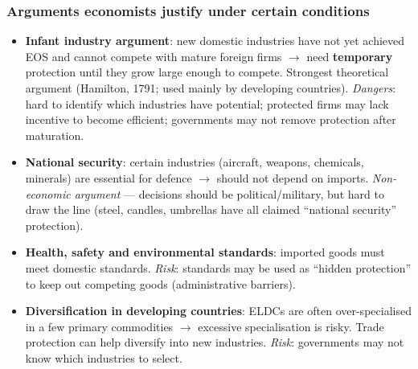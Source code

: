 \documentclass[a4paper,12pt]{article}
\begin{document}
\subsubsection*{Arguments economists justify under certain conditions}
\begin{itemize}
  \item \textbf{Infant industry argument}: new domestic industries have not yet achieved EOS and cannot compete with mature foreign firms $\to$ need \textbf{temporary} protection until they grow large enough to compete. Strongest theoretical argument (Hamilton, 1791; used mainly by developing countries). \textit{Dangers}: hard to identify which industries have potential; protected firms may lack incentive to become efficient; governments may not remove protection after maturation.
  \item \textbf{National security}: certain industries (aircraft, weapons, chemicals, minerals) are essential for defence $\to$ should not depend on imports. \textit{Non-economic argument} --- decisions should be political/military, but hard to draw the line (steel, candles, umbrellas have all claimed ``national security'' protection).
  \item \textbf{Health, safety and environmental standards}: imported goods must meet domestic standards. \textit{Risk}: standards may be used as ``hidden protection'' to keep out competing goods (administrative barriers).
  \item \textbf{Diversification in developing countries}: ELDCs are often over-specialised in a few primary commodities $\to$ excessive specialisation is risky. Trade protection can help diversify into new industries. \textit{Risk}: governments may not know which industries to select.
\end{itemize}
\end{document}

